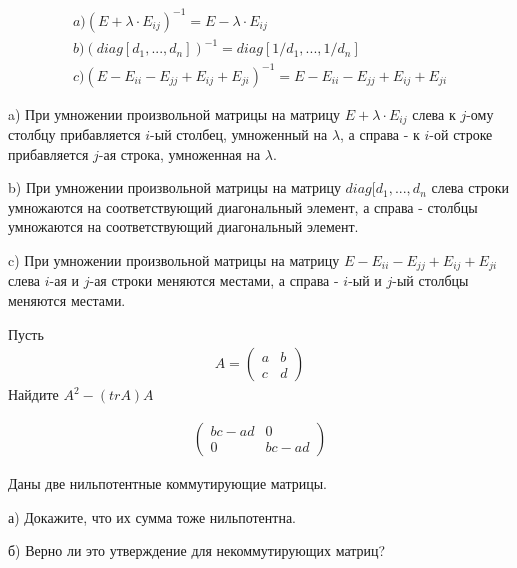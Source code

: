 \begin{nb}

\begin{gather*}
    a) (E + \lambda \cdot E_{ij})^{-1} = E - \lambda \cdot E_{ij} \\
    b) (diag[d_1,...,d_n])^{-1} = diag[1/d_1,...,1/d_n] \\
    c) (E - E_{ii} - E_{jj} + E_{ij} + E_{ji})^{-1} = E - E_{ii} - E_{jj} + E_{ij} + E_{ji}
\end{gather*}

a) При умножении произвольной матрицы на матрицу $E + \lambda \cdot E_{ij}$ слева к $j$-ому столбцу прибавляется $i$-ый столбец, умноженный на $\lambda$, а справа - к $i$-ой строке прибавляется $j$-ая строка, умноженная на $\lambda$.

b) При умножении произвольной матрицы на матрицу $diag[d_1,...,d_n$ слева строки умножаются на соответствующий диагональный элемент, а справа - столбцы умножаются на соответствующий диагональный элемент.

c) При умножении произвольной матрицы на матрицу $E - E_{ii} - E_{jj} + E_{ij} + E_{ji}$ слева $i$-ая и $j$-ая строки меняются местами, а справа - $i$-ый и $j$-ый столбцы меняются местами.

\end{nb}

\begin{prb}
    Пусть 
    \begin{gather*}
        A =  \left(
        \begin{array}{cc}
            a &  b \\
           c  &   d
        \end{array}
        \right)
    \end{gather*}
    Найдите $A^2 - (tr A)A$
\end{prb}

\begin{sol}
    \begin{gather*}
        \left(
        \begin{array}{cc}
            bc - ad &  0 \\
            0  &   bc - ad
        \end{array}
        \right)
    \end{gather*}
\end{sol}

\begin{prb}
    Даны две нильпотентные коммутирующие матрицы.
    
    а) Докажите, что их сумма тоже нильпотентна.
    
    б) Верно ли это утверждение для некоммутирующих матриц?
\end{prb}

